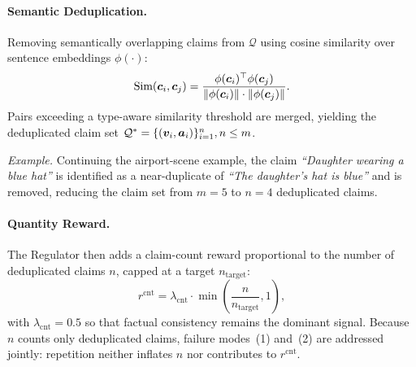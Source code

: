\paragraph{Semantic Deduplication.}
Removing semantically overlapping
claims from $\mathcal{Q}$ using cosine similarity over sentence embeddings
$\phi(\cdot)$:
\begin{equation}
    \text{Sim}({\bm{c}}_i, {\bm{c}}_j)
    = \frac{\phi({\bm{c}}_i)^{\top} \phi({\bm{c}}_j)}
           {\|\phi({\bm{c}}_i)\| \cdot \|\phi({\bm{c}}_j)\|}.
\end{equation}
Pairs exceeding a type-aware similarity threshold are merged, yielding the
deduplicated claim set $\mathcal{Q}^{\ast} = \{({\bm{v}}_i, {\bm{a}}_i)\}_{i=1}^{n}, n \leq m$.

\smallskip
\noindent\textit{Example.}
Continuing the airport-scene example, the claim \textit{``Daughter wearing a blue hat''} is identified as a near-duplicate of \textit{``The daughter's hat is blue''} and is removed, reducing the claim set from $m=5$ to $n=4$ deduplicated claims.

\paragraph{Quantity Reward.}
The Regulator then adds a claim-count reward
proportional to the number of deduplicated claims $n$, capped at a target
$n_{\text{target}}$:
\begin{equation}
    r^{\text{cnt}}
    = \lambda_{\text{cnt}}
      \cdot \min (\frac{n}{n_{\text{target}}},1),
\end{equation}
with $\lambda_{\text{cnt}} = 0.5$ so that factual consistency remains
the dominant signal.
Because $n$ counts only deduplicated claims, failure modes~(1) and~(2)
are addressed jointly: repetition neither inflates $n$ nor contributes
to $r^{\text{cnt}}$.


